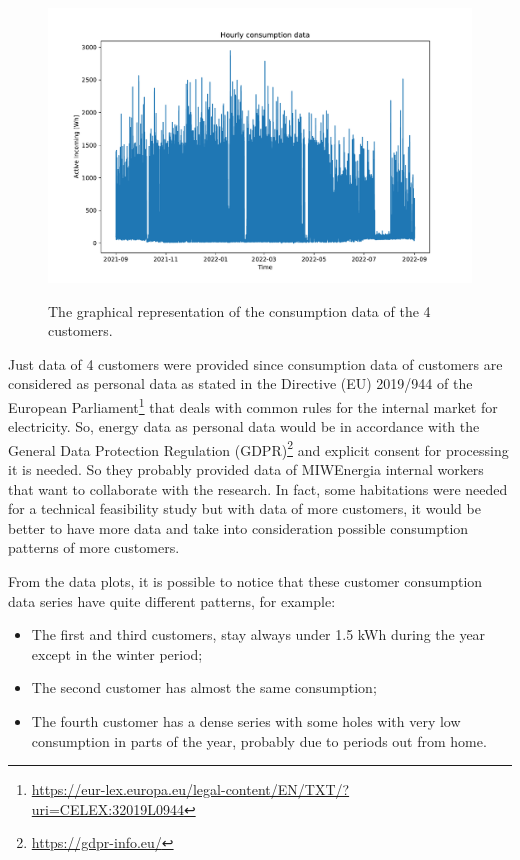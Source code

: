 \begin{figure}[H]
\begin{minipage}[b]{8.5cm}
\label{fig:dataplotcustomer3}
\end{minipage}
\ \hspace{2mm} \
\begin{minipage}[b]{8.5cm}
\centering
\includegraphics[width=1\textwidth]{images/baseline/data_plot_customer4}
\subcaption{Fourth customer.}
\label{fig:dataplotcustomer4}
\end{minipage}
\caption{The graphical representation of the consumption data of the 4 customers.}
\end{figure}

Just data of 4 customers were provided since consumption data of customers are considered as personal data as stated in the Directive (EU) 2019/944 of the European Parliament\footnote{ \url{https://eur-lex.europa.eu/legal-content/EN/TXT/?uri=CELEX:32019L0944} } that deals with common rules for the internal market for electricity.
So, energy data as personal data would be in accordance with the General Data Protection Regulation (GDPR)\footnote{ \url{https://gdpr-info.eu/} } and explicit consent for processing it is needed.
So they probably provided data of MIWEnergia internal workers that want to collaborate with the research.
In fact, some habitations were needed for a technical feasibility study but with data of more customers, it would be better to have more data and take into consideration possible consumption patterns of more customers.

From the data plots, it is possible to notice that these customer consumption data series have quite different patterns, for example:
\begin{itemize}
  \item The first and third customers, stay always under 1.5 kWh during the year except in the winter period;
  \item The second customer has almost the same consumption;
  \item The fourth customer has a dense series with some holes with very low consumption in parts of the year, probably due to periods out from home.
\end{itemize}

